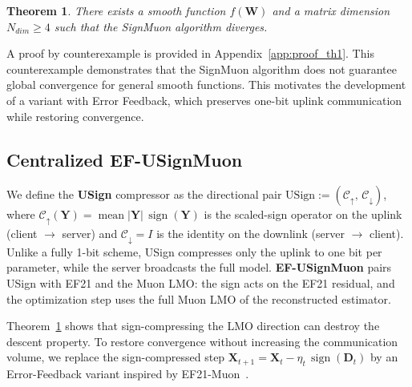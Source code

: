 \documentclass{article}
\newtheorem{theorem}{Theorem}
\begin{document}
\begin{theorem}\label{th:1} There exists a smooth function $f(\mathbf{W})$ and a matrix dimension $N_{dim} \geq 4$ such that the SignMuon algorithm diverges.
\end{theorem}
A proof by counterexample is provided in Appendix~\ref{app:proof_th1}. 
This counterexample demonstrates that the SignMuon algorithm does not guarantee global convergence for general smooth functions. This motivates the development of a variant with Error Feedback, which preserves one-bit uplink communication while restoring convergence.

\subsection{Centralized EF-USignMuon}

We define the \textbf{USign} compressor as the directional pair $\mathrm{USign} := (\mathcal{C}_{\uparrow},\, \mathcal{C}_{\downarrow})$, where $\mathcal{C}_{\uparrow}(\mathbf{Y}) = \operatorname{mean}|\mathbf{Y}|\,\operatorname{sign}(\mathbf{Y})$ is the scaled-sign operator on the uplink (client $\to$ server) and $\mathcal{C}_{\downarrow} = I$ is the identity on the downlink
(server $\to$ client). Unlike a fully 1-bit scheme, USign compresses only the uplink to one bit per parameter, while the server broadcasts the full model. \textbf{EF-USignMuon} pairs USign with EF21 and the Muon LMO: the sign acts on the EF21 residual, and the optimization step uses the full Muon LMO of the reconstructed estimator.

Theorem~\ref{th:1} shows that sign-compressing the LMO direction can destroy the descent property. To restore convergence without increasing the communication volume, we replace the sign-compressed step $\mathbf{X}_{t+1}=\mathbf{X}_t -\eta_t\,\operatorname{sign}(\mathbf{D}_t)$ by an Error-Feedback variant inspired by EF21-Muon~\cite{gruntkowska2025error}.
\end{document}
